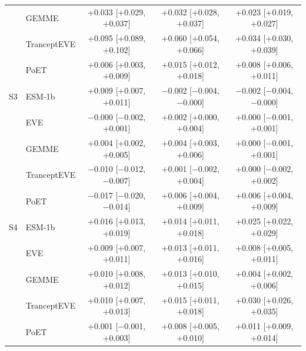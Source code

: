 \begin{tabular}{llccc}
 & GEMME & +0.033 [+0.029, +0.037] & +0.032 [+0.028, +0.037] & +0.023 [+0.019, +0.027] \\
 & TranceptEVE & +0.095 [+0.089, +0.102] & +0.060 [+0.054, +0.066] & +0.034 [+0.030, +0.039] \\
 & PoET & +0.006 [+0.003, +0.009] & +0.015 [+0.012, +0.018] & +0.008 [+0.006, +0.011] \\
\midrule
S3 & ESM-1b & +0.009 [+0.007, +0.011] & $-$0.002 [$-$0.004, $-$0.000] & $-$0.002 [$-$0.004, $-$0.000] \\
 & EVE & $-$0.000 [$-$0.002, +0.001] & +0.002 [+0.000, +0.004] & +0.000 [$-$0.001, +0.001] \\
 & GEMME & +0.004 [+0.002, +0.005] & +0.004 [+0.003, +0.006] & +0.000 [$-$0.001, +0.001] \\
 & TranceptEVE & $-$0.010 [$-$0.012, $-$0.007] & +0.001 [$-$0.002, +0.004] & +0.000 [$-$0.002, +0.002] \\
 & PoET & $-$0.017 [$-$0.020, $-$0.014] & +0.006 [+0.004, +0.009] & +0.006 [+0.004, +0.009] \\
\midrule
S4 & ESM-1b & +0.016 [+0.013, +0.019] & +0.014 [+0.011, +0.018] & +0.025 [+0.022, +0.029] \\
 & EVE & +0.009 [+0.007, +0.011] & +0.013 [+0.011, +0.016] & +0.008 [+0.005, +0.011] \\
 & GEMME & +0.010 [+0.008, +0.012] & +0.013 [+0.010, +0.015] & +0.004 [+0.002, +0.006] \\
 & TranceptEVE & +0.010 [+0.007, +0.013] & +0.015 [+0.011, +0.018] & +0.030 [+0.026, +0.035] \\
 & PoET & +0.001 [$-$0.001, +0.003] & +0.008 [+0.005, +0.010] & +0.011 [+0.009, +0.014] \\
\bottomrule
\end{tabular}
